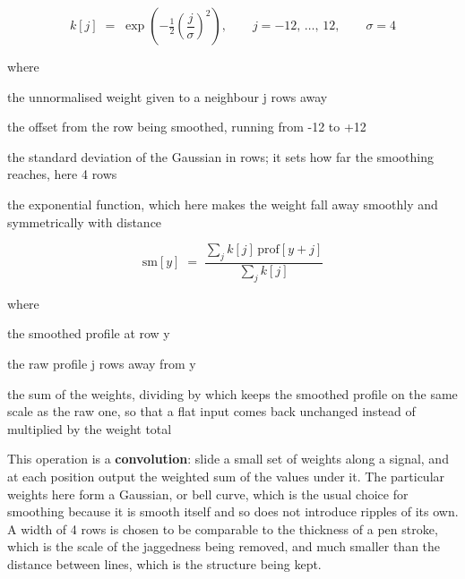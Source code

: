 \begin{equation}
k[j] \;=\; \exp\!\left(-\tfrac{1}{2}\left(\frac{j}{\sigma}\right)^{\!2}\right),\qquad j = -12,\,\dots,\,12, \qquad \sigma = 4
\end{equation}

\noindent where
\begin{description}[leftmargin=2.4em,style=nextline,font=\normalfont\ttfamily]\setlength\itemsep{1pt}
  \item[{$k[j]$}] \normalfont the unnormalised weight given to a neighbour j rows away
  \item[{$j$}] \normalfont the offset from the row being smoothed, running from -12 to +12
  \item[{$\sigma$}] \normalfont the standard deviation of the Gaussian in rows; it sets how far the smoothing reaches, here 4 rows
  \item[{$\exp(\cdot)$}] \normalfont the exponential function, which here makes the weight fall away smoothly and symmetrically with distance
\end{description}

\begin{equation}
\mathrm{sm}[y] \;=\; \frac{\sum_{j} k[j]\,\mathrm{prof}[y+j]}{\sum_{j} k[j]}
\end{equation}

\noindent where
\begin{description}[leftmargin=2.4em,style=nextline,font=\normalfont\ttfamily]\setlength\itemsep{1pt}
  \item[{$\mathrm{sm}[y]$}] \normalfont the smoothed profile at row y
  \item[{$\mathrm{prof}[y+j]$}] \normalfont the raw profile j rows away from y
  \item[{$\sum_{j} k[j]$}] \normalfont the sum of the weights, dividing by which keeps the smoothed profile on the same scale as the raw one, so that a flat input comes back unchanged instead of multiplied by the weight total
\end{description}
This operation is a \textbf{convolution}: slide a small set of weights along a signal, and at each position output the weighted sum of the values under it. The particular weights here form a Gaussian, or bell curve, which is the usual choice for smoothing because it is smooth itself and so does not introduce ripples of its own. A width of 4 rows is chosen to be comparable to the thickness of a pen stroke, which is the scale of the jaggedness being removed, and much smaller than the distance between lines, which is the structure being kept.


